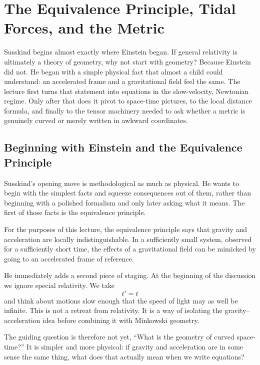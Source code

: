\chapter{The Equivalence Principle, Tidal Forces, and the Metric}

Susskind begins almost exactly where Einstein began.  If general relativity is ultimately a theory of geometry, why not start with geometry?  Because Einstein did not.  He began with a simple physical fact that almost a child could understand: an accelerated frame and a gravitational field feel the same.  The lecture first turns that statement into equations in the slow-velocity, Newtonian regime.  Only after that does it pivot to space-time pictures, to the local distance formula, and finally to the tensor machinery needed to ask whether a metric is genuinely curved or merely written in awkward coordinates.

\section{Beginning with Einstein and the Equivalence Principle}

Susskind's opening move is methodological as much as physical.  He wants to begin with the simplest facts and squeeze consequences out of them, rather than beginning with a polished formalism and only later asking what it means.  The first of those facts is the equivalence principle.

\begin{definition}
For the purposes of this lecture, the equivalence principle says that gravity and acceleration are locally indistinguishable.  In a sufficiently small system, observed for a sufficiently short time, the effects of a gravitational field can be mimicked by going to an accelerated frame of reference.
\end{definition}

He immediately adds a second piece of staging.  At the beginning of the discussion we ignore special relativity.  We take
\begin{equation}
t'=t
\end{equation}
and think about motions slow enough that the speed of light may as well be infinite.  This is not a retreat from relativity.  It is a way of isolating the gravity--acceleration idea before combining it with Minkowski geometry.

The guiding question is therefore not yet, ``What is the geometry of curved space-time?''  It is simpler and more physical: if gravity and acceleration are in some sense the same thing, what does that actually mean when we write equations?


